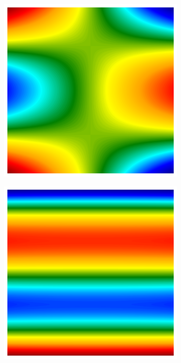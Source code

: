 \documentclass{beamer}
\begin{document}
\begin{frame}
\begin{columns}[T]
\begin{column}{0.31\textwidth}
{{\begin{minipage}{1.2\linewidth}
\begin{minipage}{0.6\linewidth}
\begin{figure}[h!]
{\begin{minipage}{\textwidth}
										\begin{subfigure}[b]{0.45\linewidth}
											\includegraphics[width=\linewidth]{figs/FFFF3.png}
											\caption{}
										\end{subfigure}
										\hfill
										\begin{subfigure}[b]{0.45\linewidth}
											\includegraphics[width=\linewidth]{figs/FFFF4.png}
											\caption{}
										\end{subfigure}
									\end{minipage}
								} %
								

\end{figure}
\end{minipage}
\end{minipage}}}
\end{column}
\end{columns}
\end{frame}
\end{document}
